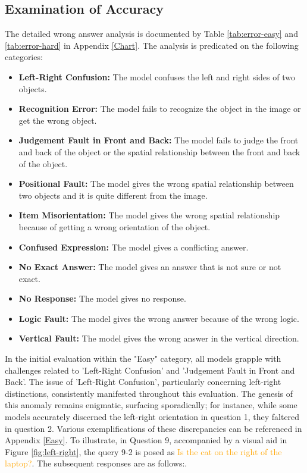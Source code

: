 \documentclass[twocolumn,11pt]{report}
\begin{document}
\subsection{Examination of Accuracy}
The detailed wrong answer analysis is documented by Table \ref{tab:error-easy} and \ref{tab:error-hard} in Appendix \ref{Chart}. The analysis is predicated on the following categories:
\begin{itemize}
    \item \textbf{Left-Right Confusion:} The model confuses the left and right sides of two objects.
    \item \textbf{Recognition Error:} The model fails to recognize the object in the image or get the wrong object.
    \item \textbf{Judgement Fault in Front and Back:} The model fails to judge the front and back of the object or the spatial relationship between the front and back of the object.
    \item \textbf{Positional Fault:} The model gives the wrong spatial relationship between two objects and it is quite different from the image.
    \item \textbf{Item Misorientation:} The model gives the wrong spatial relationship because of getting a wrong orientation of the object.
    \item \textbf{Confused Expression:} The model gives a conflicting answer.
    \item \textbf{No Exact Answer:} The model gives an answer that is not sure or not exact.
    \item \textbf{No Response:} The model gives no response.
    \item \textbf{Logic Fault:} The model gives the wrong answer because of the wrong logic.
    \item \textbf{Vertical Fault:} The model gives the wrong answer in the vertical direction.
\end{itemize}

In the initial evaluation within the "Easy" category, all models grapple with challenges related to 'Left-Right Confusion' and 'Judgement Fault in Front and Back'. The issue of 'Left-Right Confusion', particularly concerning left-right distinctions, consistently manifested throughout this evaluation. The genesis of this anomaly remains enigmatic, surfacing sporadically; for instance, while some models accurately discerned the left-right orientation in question 1, they faltered in question 2. Various exemplifications of these discrepancies can be referenced in Appendix \ref{Easy}. To illustrate, in Question 9, accompanied by a visual aid in Figure \ref{fig:left-right}, the query 9-2 is posed as \textcolor{orange}{Is the cat on the right of the laptop?}. The subsequent responses are as follows:.
\end{document}
